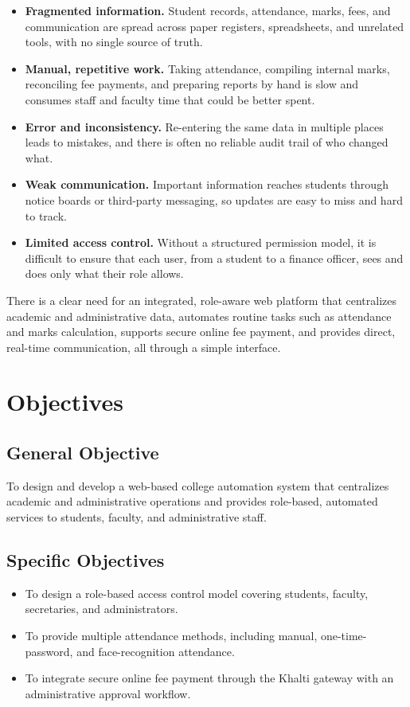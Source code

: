 \documentclass[12pt,a4paper]{report}
\begin{document}
\begin{itemize}
    \item \textbf{Fragmented information.} Student records, attendance, marks, fees, and communication are spread across paper registers, spreadsheets, and unrelated tools, with no single source of truth.
    \item \textbf{Manual, repetitive work.} Taking attendance, compiling internal marks, reconciling fee payments, and preparing reports by hand is slow and consumes staff and faculty time that could be better spent.
    \item \textbf{Error and inconsistency.} Re-entering the same data in multiple places leads to mistakes, and there is often no reliable audit trail of who changed what.
    \item \textbf{Weak communication.} Important information reaches students through notice boards or third-party messaging, so updates are easy to miss and hard to track.
    \item \textbf{Limited access control.} Without a structured permission model, it is difficult to ensure that each user, from a student to a finance officer, sees and does only what their role allows.
\end{itemize}

There is a clear need for an integrated, role-aware web platform that centralizes academic and administrative data, automates routine tasks such as attendance and marks calculation, supports secure online fee payment, and provides direct, real-time communication, all through a simple interface.

\section{Objectives}

\subsection{General Objective}

To design and develop a web-based college automation system that centralizes academic and administrative operations and provides role-based, automated services to students, faculty, and administrative staff.

\subsection{Specific Objectives}

\begin{itemize}
    \item To design a role-based access control model covering students, faculty, secretaries, and administrators.
    \item To provide multiple attendance methods, including manual, one-time-password, and face-recognition attendance.
    \item To integrate secure online fee payment through the Khalti gateway with an administrative approval workflow.
\end{itemize}
\end{document}
